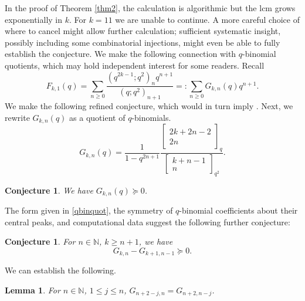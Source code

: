 \documentclass[12pt,reqno]{amsart}
\newcommand{\N}{\mathbb{N}}
\renewcommand{\(}{\left\(}
\renewcommand{\)}{\right\)}
\numberwithin{equation}{section}
\theoremstyle{plain}
\newtheorem{lemma}[theorem]{Lemma}
\newtheorem{conjecture}[theorem]{Conjecture}
\theoremstyle{definition}
\numberwithin{equation}{section}
\begin{document}
In the proof of Theorem \ref{thm2}, the calculation is algorithmic but the lcm grows exponentially in $k$. For $k=11$ we are unable to continue.  A more careful choice of where to cancel might allow further calculation; sufficient systematic insight, possibly including some combinatorial injections, might even be able to fully establish the conjecture. We make the following connection with $q$-binomial quotients, which may hold independent interest for some readers.  Recall 
\begin{equation}\label{gkn}
F_{k,1}(q)=\sum_{n\ge 0}\frac{\left(q^{2k-1};q^2\right)_nq^{n+1}}{\left(q;q^2\right)_{n+1}} =: \sum_{n \geq 0} G_{k,n} (q) q^{n+1}.
\end{equation}
We make the following refined conjecture, which would in turn imply . Next, we rewrite $G_{k,n}(q)$ as a quotient of $q$-binomials. %
\begin{equation}\label{qbinquot}
G_{k,n}(q) = \frac{1}{1-q^{2n+1}} \frac{\begin{bmatrix} 2k+2n-2 \\ 2n \end{bmatrix}_{q}}{\begin{bmatrix} k+n-1 \\ n \end{bmatrix}_{q^2}}.
\end{equation}
 

\begin{conjecture} We have $G_{k,n}(q) \succeq 0$.
\end{conjecture}

The form given in \eqref{qbinquot}, the symmetry of $q$-binomial coefficients about their central peaks, and computational data suggest the following further conjecture: 

\begin{conjecture}\label{gkndiffplusone} For $n\in\N$, $k \geq n+1$, we have $$G_{k,n} - G_{k+1,n-1} \succeq 0.$$  
\end{conjecture}

We can establish the following. 

\begin{lemma}\label{gknsmallk} For $n\in\N$, $1 \leq j \leq n$, $G_{n+2-j,n} = G_{n+2,n-j}$.
\end{lemma}
\end{document}
